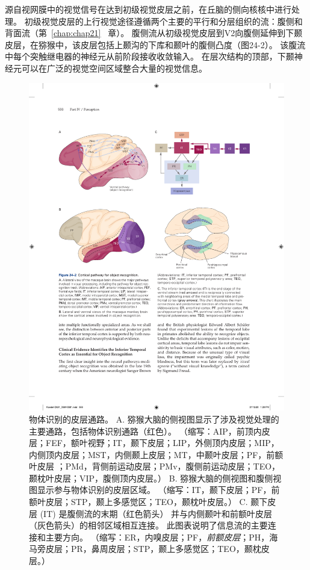 源自视网膜中的视觉信号在达到初级视觉皮层之前，在丘脑的侧向核核中进行处理。
初级视觉皮层的上行视觉途径遵循两个主要的平行和分层组织的流：腹侧和背面流（第~\ref{chap:chap21}~ 章）。
腹侧流从初级视觉皮层到V2向腹侧延伸到下颞皮层，在猕猴中，该皮层包括上颞沟的下库和颞叶的腹侧凸度（图24-2）。
该腹流中每个突触继电器的神经元从前阶段接收收敛输入。
在层次结构的顶部，下颞神经元可以在广泛的视觉空间区域整合大量的视觉信息。


\begin{figure}[htbp]
	\centering
	\includegraphics[width=0.95\linewidth]{chap24/fig_24_2}
	\caption{物体识别的皮层通路。
		A. 猕猴大脑的侧视图显示了涉及视觉处理的主要通路，包括物体识别通路（红色）。
		（缩写：AIP，前顶内皮层；FEF，额叶视野；IT，颞下皮层；LIP，外侧顶内皮层；MIP，内侧顶内皮层；MST，内侧颞上皮层；MT，中颞叶皮层；PF，前额叶皮层 ；PMd，背侧前运动皮层；PMv，腹侧前运动皮层；TEO，颞枕叶皮层；VIP，腹侧顶内皮层。）
		B. 猕猴大脑的侧视图和腹侧视图显示参与物体识别的皮层区域。
		（缩写：IT，颞下皮层；PF，前额叶皮层；STP，颞上多感觉区；TEO，颞枕叶皮层。）
		C. 颞下皮层 (IT) 是腹侧流的末期（红色箭头） 并与内侧颞叶和前额叶皮层（灰色箭头）的相邻区域相互连接。 
		此图表说明了信息流的主要连接和主要方向。 
		（缩写：ER，内嗅皮层；PF，\textit{前额皮层}；PH，海马旁皮层；PR，鼻周皮层；STP，颞上多感觉区；TEO，颞枕皮层。）}
	\label{fig:24_2}
\end{figure}


